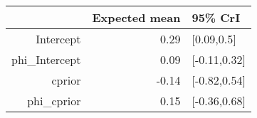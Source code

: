 \begin{tabular}{rrl}
  \hline
 & Expected mean & 95\% CrI \\ 
  \hline
Intercept & 0.29 & [0.09,0.5] \\ 
  phi\_Intercept & 0.09 & [-0.11,0.32] \\ 
  cprior & -0.14 & [-0.82,0.54] \\ 
  phi\_cprior & 0.15 & [-0.36,0.68] \\ 
   \hline
\end{tabular}

